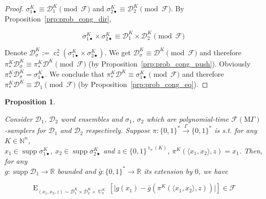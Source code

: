 \documentclass[11pt]{article}
\numberwithin{equation}{section}
\theoremstyle{definition}
\theoremstyle{plain}
\newtheorem{proposition}{Proposition}[section]
\newcommand{\Bool}{\{0,1\}}
\newcommand{\Words}{{\Bool^*}}
\DeclareMathOperator{\Supp}{supp}
\DeclareMathOperator{\E}{E}
\DeclareMathOperator{\R}{r}
\DeclareMathOperator{\Un}{U}
\DeclareMathOperator{\En}{c}
\newcommand{\Nats}{\mathbb{N}}
\newcommand{\Reals}{\mathbb{R}}
\newcommand{\Abs}[1]{\lvert #1 \rvert}
\newcommand{\Chev}[1]{\langle #1 \rangle}
\newcommand{\Dist}{\mathcal{D}}
\newcommand{\MGrow}{\mathrm{M}\Gamma}
\newcommand{\Fall}{\mathcal{F}}
\newcommand{\EMG}{\Fall(\MGrow)}
\newcommand{\Scheme}{\xrightarrow{\Gamma}}
\begin{document}
\begin{proof}

$\sigma_{1\bullet}^{K} \equiv \Dist_1^{K} \pmod \Fall$ and $\sigma_{2\bullet}^{K} \equiv \Dist_2^{K} \pmod \Fall$.  By Proposition~\ref{prp:prob_cong_dir},

\[\sigma_{1\bullet}^{K} \times \sigma_{2\bullet}^{K} \equiv \Dist_1^{K} \times \Dist_2^{K} \pmod \Fall\]

Denote $\Dist_\sigma^{K}:=\En_*^2(\sigma_{1\bullet}^{K} \times \sigma_{2\bullet}^{K})$. We get ${\Dist_\sigma^{K} \equiv \Dist^{K} \pmod \Fall}$ and therefore ${\pi_*^K\Dist_\sigma^{K} \equiv \pi_*^K\Dist^{K} \pmod \Fall}$ (by Proposition~\ref{prp:prob_cong_push}). Obviously $\pi_*^K\Dist_\sigma^{K}=\sigma_{1\bullet}^{K}$. We conclude that ${\pi_*^K\Dist^{K} \equiv \sigma_{1\bullet}^{K} \pmod \Fall}$ and therefore ${\pi_*^K\Dist^{K} \equiv \Dist_1 \pmod \Fall}$ (by Proposition~\ref{prp:prob_cong_eq}).
\end{proof}

\begin{samepage}
\begin{proposition}
\label{prp:thm__mult__cond2}

Consider $\Dist_1$, $\Dist_2$ word ensembles and $\sigma_1$, $\sigma_2$ which are polynomial-time $\EMG$-samplers for $\Dist_1$ and $\Dist_2$ respectively. Suppose $\pi: \Words \Scheme \Words$ is s.t. for any $K \in \Nats^n$,\\ $x_1 \in \Supp \sigma_{1\bullet}^{K}$, ${x_2 \in \Supp \sigma_{2\bullet}^{K}}$ and $z \in \Bool^{\R_\pi(K)}$, $\pi^{K}(\Chev{x_1,x_2},z)=x_1$. Then, for any\\ $g: \Supp \Dist_1 \rightarrow \Reals$ bounded and ${\bar{g}: \Words \rightarrow \Reals}$ its extension by ${0}$, we have 

$$\E_{(x_1,x_2,z) \sim\Dist_1^{K} \times \Dist_2^{K} \times \Un_\pi^{K}}[\Abs{g(x_1)-\bar{g}(\pi^{K}(\Chev{x_1,x_2},z))}] \in \Fall$$

\end{proposition}
\end{samepage}
\end{document}
